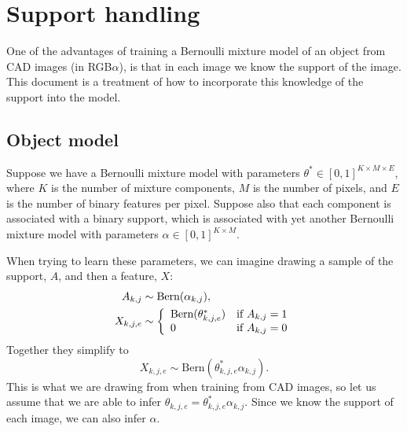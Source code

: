 \documentclass{article}
\newcommand{\Bern}[1]{\text{Bern}(#1)}
\begin{document}


\section{Support handling}
One of the advantages of training a Bernoulli mixture model of an object from CAD images (in RGB$\alpha$), is that in each image we know the support of the image. This document is a treatment of how to incorporate this knowledge of the support into the model.
%
%
%


\subsection{Object model}
Suppose we have a Bernoulli mixture model with parameters $\theta^* \in [0, 1]^{K \times M \times E}$, where $K$ is the number of mixture components, $M$ is the number of pixels, and $E$ is the number of binary features per pixel. Suppose also that each component is associated with a binary support, which is associated with yet another Bernoulli mixture model with parameters $\alpha \in [0, 1]^{K \times M}$.

When trying to learn these parameters, we can imagine drawing a sample of the support, $A$, and then a feature, $X$:
\begin{align*}
    A_{k,j} & \sim \Bern{\alpha_{k,j}}, \\
    X_{k,j,e} & \sim \left\{
        \begin{array}{l l}
            \Bern{\theta^*_{k,j,e}} & \text{if }A_{k,j} = 1  \\
            0 & \text{if }A_{k,j} = 0
        \end{array} \right.
\end{align*}
Together they simplify to 
\[
    X_{k,j,e} \sim \Bern{\theta^*_{k,j,e} \alpha_{k,j}}.
\] 
This is what we are drawing from when training from CAD images, so let us assume that we are able to infer $\theta_{k,j,e} = \theta^*_{k,j,e} \alpha_{k,j}$. Since we know the support of each image, we can also infer $\alpha$.
\end{document}
